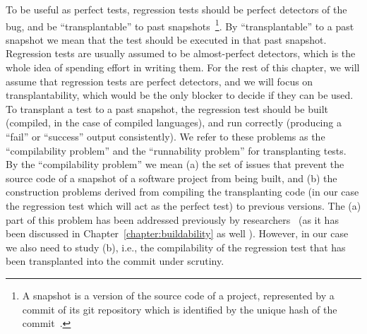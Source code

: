 To be useful as perfect tests, regression tests should be perfect detectors of the bug, and be ``transplantable'' to past snapshots~\footnote{A snapshot is a version of the source code of a project, represented by a commit of its git repository which is identified by the unique hash of the commit~\cite{maes2022revisiting}.}. By ``transplantable'' to a past snapshot we mean that the test should be executed in that past snapshot. Regression tests are usually assumed to be almost-perfect detectors, 
which is the whole idea of spending effort in writing them. For the rest of this chapter, we will assume that regression tests are perfect detectors, and we will focus on transplantability, which would be the only blocker to decide if they can be used. To transplant a test to a past snapshot, the regression test should be built (compiled, in the case of compiled languages), and run correctly (producing a ``fail'' or ``success'' output consistently).
We refer to these  problems as the ``compilability problem'' and the ``runnability problem'' for transplanting tests.
By the ``compilability problem'' we mean (a) the set of issues that prevent the source code of a snapshot of a software project from being built, and (b) the construction problems derived from compiling the transplanting code (in our case the regression test which will act as the perfect test) to previous versions. The (a) part of this problem has been addressed previously by researchers~\cite{tufano2017there}  (as it has been discussed in Chapter~\ref{chapter:buildability} as well ). However, in our case we also need to study (b), i.e., the compilability of the regression test that has been transplanted into the commit under scrutiny. 
